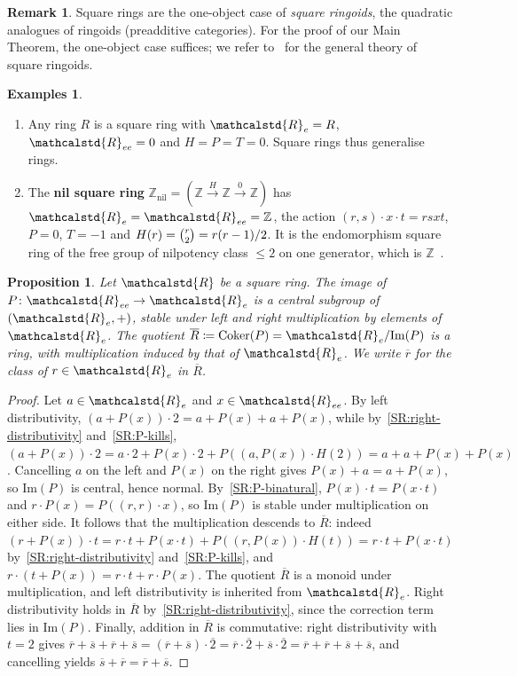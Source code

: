 \documentclass[reqno,a4paper]{amsart}
\renewcommand{\binom}{\tbinom} %
\theoremstyle{plain}
\newtheorem{proposition}[subsection]{Proposition}
\theoremstyle{definition}
\newtheorem{examples}[subsection]{Examples}
\newtheorem{remark}[subsection]{Remark}
\newcommand{\defn}{\textbf}
\newcommand{\DefEq}{\coloneq}
\newcommand{\R}{\ensuremath{\mathcalstd{R}}}
\newcommand{\Z}{\ensuremath{\mathbb{Z}}}
\DeclareMathOperator{\nil}{nil}
\DeclareMathOperator{\Coker}{Coker}
\renewcommand{\Im}{\ensuremath{\mathrm{Im}}}
\newcommand{\sqring}[4]{\ensuremath{(#1\xrightarrow{#3}#2\xrightarrow{#4}#1)}}
\renewcommand{\Re}{\ensuremath{\R_{e}}}
\newcommand{\Ree}{\ensuremath{\R_{ee}}}
\newcommand{\Rbar}{\ensuremath{\overline{R}}}
\begin{document}
\begin{remark}
  Square rings are the one-object case of \emph{square ringoids}, the quadratic analogues of ringoids (preadditive categories). For the proof of our Main Theorem, the one-object case suffices; we refer to~\cite{BHP} for the general theory of square ringoids.
\end{remark}

\begin{examples}\label{ex:square-rings}
  \begin{enumerate}
    \item\label{ex:ring-as-square-ring} Any ring \(R\) is a square ring with \(\Re=R\), \(\Ree=0\) and \(H=P=T=0\). Square rings thus generalise rings.
    \item\label{ex:Z-nil} The \defn{nil square ring} \(\Z_{\nil}=\sqring{\Z}{\Z}{H}{0}\) has \(\Re=\Ree=\Z\), the action \((r,s)\cdot x\cdot t=rsxt\), \(P=0\), \(T=-1\) and \(H(r)=\binom{r}{2}=r(r-1)/2\). It is the endomorphism square ring of the free group of nilpotency class \(\leq 2\) on one generator, which is \(\Z\)~\cite[Section~7]{BHP}.
  \end{enumerate}
\end{examples}

\begin{proposition}\label{prop:coker-P}
  Let \(\R\) be a square ring. The image of \(P\colon \Ree\to\Re\) is a central subgroup of \((\Re,+)\), stable under left and right multiplication by elements of \(\Re\). The quotient \(\Rbar\DefEq\Coker(P)=\Re/\Im(P)\) is a ring, with multiplication induced by that of \(\Re\). We write \(\overline{r}\) for the class of \(r\in\Re\) in \(\Rbar\).
\end{proposition}

\begin{proof}
  Let \(a\in\Re\) and \(x\in\Ree\). By left distributivity, \((a+P(x))\cdot 2=a+P(x)+a+P(x)\), while by~\ref{SR:right-distributivity} and~\ref{SR:P-kills}, \((a+P(x))\cdot 2=a\cdot 2+P(x)\cdot 2+P((a,P(x))\cdot H(2))=a+a+P(x)+P(x)\). Cancelling \(a\) on the left and \(P(x)\) on the right gives \(P(x)+a=a+P(x)\), so \(\Im(P)\) is central, hence normal. By~\ref{SR:P-binatural}, \(P(x)\cdot t=P(x\cdot t)\) and \(r\cdot P(x)=P((r,r)\cdot x)\), so \(\Im(P)\) is stable under multiplication on either side. It follows that the multiplication descends to \(\Rbar\): indeed \((r+P(x))\cdot t=r\cdot t+P(x\cdot t)+P((r,P(x))\cdot H(t))=r\cdot t+P(x\cdot t)\) by~\ref{SR:right-distributivity} and~\ref{SR:P-kills}, and \(r\cdot(t+P(x))=r\cdot t+r\cdot P(x)\). The quotient \(\Rbar\) is a monoid under multiplication, and left distributivity is inherited from \(\Re\). Right distributivity holds in \(\Rbar\) by~\ref{SR:right-distributivity}, since the correction term lies in \(\Im(P)\). Finally, addition in \(\Rbar\) is commutative: right distributivity with \(t=2\) gives \(\overline{r}+\overline{s}+\overline{r}+\overline{s}=(\overline{r}+\overline{s})\cdot\overline{2}=\overline{r}\cdot\overline{2}+\overline{s}\cdot\overline{2}=\overline{r}+\overline{r}+\overline{s}+\overline{s}\), and cancelling yields \(\overline{s}+\overline{r}=\overline{r}+\overline{s}\).
\end{proof}
\end{document}
